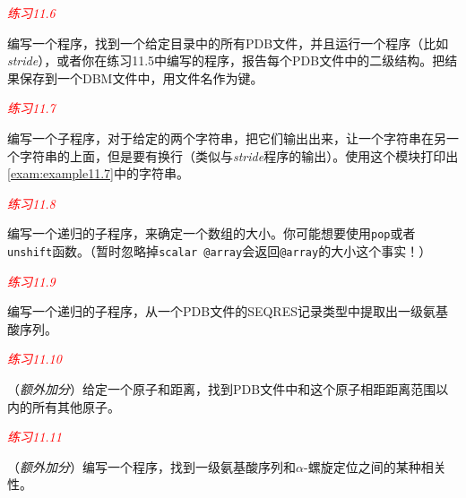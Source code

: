 \textcolor{red}{\textit{练习11.6}}
\begin{adjustwidth}{1cm}{}
编写一个程序，找到一个给定目录中的所有PDB文件，并且运行一个程序（比如\textit{stride}），或者你在练习11.5中编写的程序，报告每个PDB文件中的二级结构。把结果保存到一个DBM文件中，用文件名作为键。
\end{adjustwidth}

\textcolor{red}{\textit{练习11.7}}
\begin{adjustwidth}{1cm}{}
编写一个子程序，对于给定的两个字符串，把它们输出出来，让一个字符串在另一个字符串的上面，但是要有换行（类似与\textit{stride}程序的输出）。使用这个模块打印出\autoref{exam:example11.7}中的字符串。
\end{adjustwidth}

\textcolor{red}{\textit{练习11.8}}
\begin{adjustwidth}{1cm}{}
编写一个递归的子程序，来确定一个数组的大小。你可能想要使用\verb|pop|或者\verb|unshift|函数。（暂时忽略掉\verb|scalar @array|会返回\verb|@array|的大小这个事实！）
\end{adjustwidth}

\textcolor{red}{\textit{练习11.9}}
\begin{adjustwidth}{1cm}{}
编写一个递归的子程序，从一个PDB文件的SEQRES记录类型中提取出一级氨基酸序列。
\end{adjustwidth}

\textcolor{red}{\textit{练习11.10}}
\begin{adjustwidth}{1cm}{}
（\textit{额外加分}）给定一个原子和距离，找到PDB文件中和这个原子相距距离范围以内的所有其他原子。
\end{adjustwidth}

\textcolor{red}{\textit{练习11.11}}
\begin{adjustwidth}{1cm}{}
（\textit{额外加分}）编写一个程序，找到一级氨基酸序列和$\alpha$-螺旋定位之间的某种相关性。
\end{adjustwidth}

